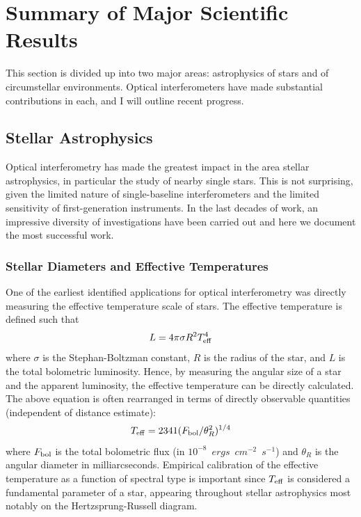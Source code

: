 \documentclass[12pt]{article}
\begin{document}
\section{Summary of Major Scientific Results}


This section is divided up into two major areas: astrophysics of stars
and of circumstellar environments.  Optical interferometers have made
substantial contributions in each, and I will 
outline recent progress.


\subsection{Stellar Astrophysics}
Optical interferometry has made the greatest impact in the area
stellar astrophysics, in particular the study of nearby single stars.  
This is not surprising, given the limited nature of
single-baseline interferometers and the limited sensitivity of
first-generation instruments.   In the last decades of work, an impressive
diversity of investigations have been carried out and here we document
the most successful work.   

\subsubsection{Stellar Diameters and Effective Temperatures}

One of the earliest identified applications for optical interferometry
was directly measuring the effective temperature scale of stars.  
The effective temperature is defined such that
\begin{equation}
L = 4 \pi \sigma R^2 T^4_{\rm eff}
\end{equation}
where $\sigma$ is the Stephan-Boltzman constant, $R$ is the radius of
the star, and $L$ is the total bolometric luminosity.  Hence, by
measuring the angular size of a star and the apparent luminosity, the
effective temperature can be directly calculated.   The above equation 
is often rearranged in terms of directly observable quantities (independent
of distance estimate):
\begin{equation}
T_{\rm eff} = 2341 (F_{\rm bol}/\theta^2_R)^{1/4}
\end{equation}
where $F_{\rm bol}$ is the
total bolometric flux (in $10^{-8}$~$ergs$~$cm^{-2}$~$s^{-1}$)
and $\theta_R$ is the angular diameter in milliarcseconds.  Empirical 
calibration of the effective temperature as a function of spectral type
is important
since $T_{\rm eff}$ is considered a fundamental parameter
of a star, appearing throughout stellar astrophysics most notably on the
Hertzsprung-Russell diagram.
\end{document}
